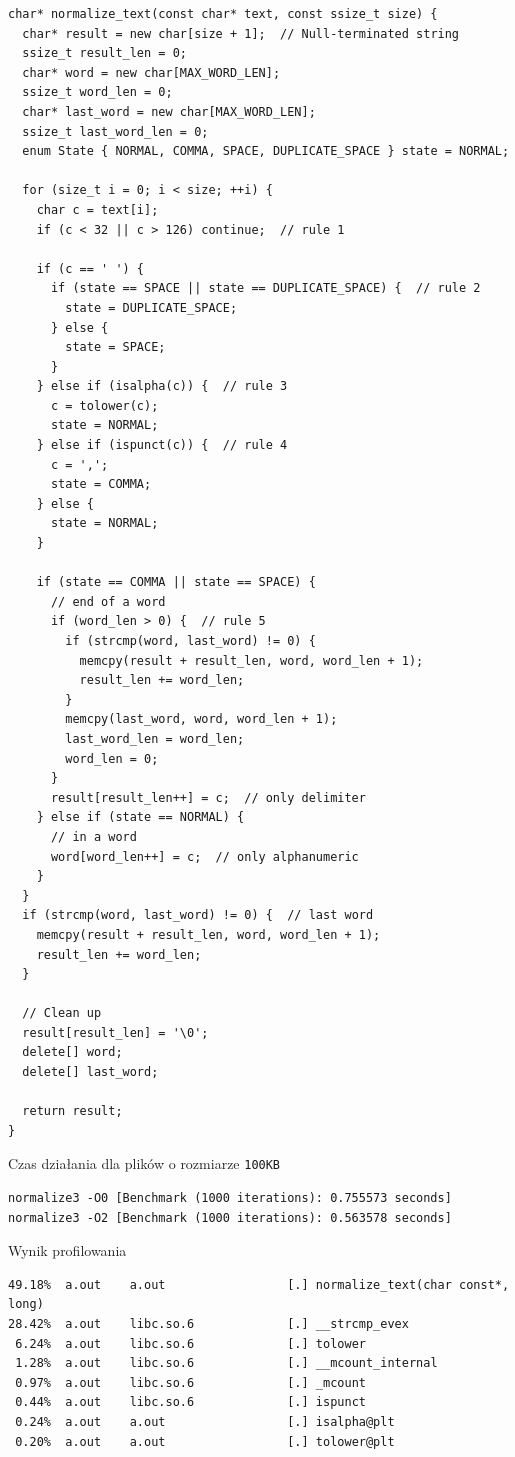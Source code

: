 \documentclass[12pt]{article}
\begin{document}
\begin{verbatim}
char* normalize_text(const char* text, const ssize_t size) {
  char* result = new char[size + 1];  // Null-terminated string
  ssize_t result_len = 0;
  char* word = new char[MAX_WORD_LEN];
  ssize_t word_len = 0;
  char* last_word = new char[MAX_WORD_LEN];
  ssize_t last_word_len = 0;
  enum State { NORMAL, COMMA, SPACE, DUPLICATE_SPACE } state = NORMAL;

  for (size_t i = 0; i < size; ++i) {
    char c = text[i];
    if (c < 32 || c > 126) continue;  // rule 1

    if (c == ' ') {
      if (state == SPACE || state == DUPLICATE_SPACE) {  // rule 2
        state = DUPLICATE_SPACE;
      } else {
        state = SPACE;
      }
    } else if (isalpha(c)) {  // rule 3
      c = tolower(c);
      state = NORMAL;
    } else if (ispunct(c)) {  // rule 4
      c = ',';
      state = COMMA;
    } else {
      state = NORMAL;
    }

    if (state == COMMA || state == SPACE) {
      // end of a word
      if (word_len > 0) {  // rule 5
        if (strcmp(word, last_word) != 0) {
          memcpy(result + result_len, word, word_len + 1);
          result_len += word_len;
        }
        memcpy(last_word, word, word_len + 1);
        last_word_len = word_len;
        word_len = 0;
      }
      result[result_len++] = c;  // only delimiter
    } else if (state == NORMAL) {
      // in a word
      word[word_len++] = c;  // only alphanumeric
    }
  }
  if (strcmp(word, last_word) != 0) {  // last word
    memcpy(result + result_len, word, word_len + 1);
    result_len += word_len;
  }

  // Clean up
  result[result_len] = '\0';
  delete[] word;
  delete[] last_word;

  return result;
}
\end{verbatim}

Czas działania dla plików o rozmiarze \verb|100KB|
\begin{verbatim}
normalize3 -O0 [Benchmark (1000 iterations): 0.755573 seconds]
normalize3 -O2 [Benchmark (1000 iterations): 0.563578 seconds]
\end{verbatim}

Wynik profilowania
\begin{verbatim}
49.18%  a.out    a.out                 [.] normalize_text(char const*, long) 
28.42%  a.out    libc.so.6             [.] __strcmp_evex 
 6.24%  a.out    libc.so.6             [.] tolower 
 1.28%  a.out    libc.so.6             [.] __mcount_internal 
 0.97%  a.out    libc.so.6             [.] _mcount 
 0.44%  a.out    libc.so.6             [.] ispunct 
 0.24%  a.out    a.out                 [.] isalpha@plt 
 0.20%  a.out    a.out                 [.] tolower@plt 
\end{verbatim}
\end{document}
